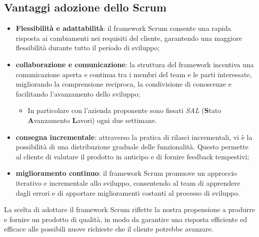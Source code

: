 \subsection{Vantaggi adozione dello Scrum}
\begin{itemize}
    \item \textbf{Flessibilità e adattabilità}: il framework Scrum consente una rapida risposta ai cambiamenti nei requisiti del cliente, garantendo una maggiore flessibilità durante tutto il periodo di sviluppo;
    \item \textbf{collaborazione e comunicazione}: la struttura del framework incentiva una comunicazione aperta e continua tra i membri del team e le parti interessate, migliorando la comprensione reciproca, la condivisione di conoscenze e facilitando l'avanzamento dello sviluppo;
    \begin{itemize}
        \item In particolare con l’azienda proponente sono fissati \textit{SAL} (\textbf{S}tato \textbf{A}vanzamento \textbf{L}avori) ogni due settimane.       
    \end{itemize}
    \item \textbf{consegna incrementale}: attraverso la pratica di rilasci incrementali, vi è la possibilità di una distribuzione graduale delle funzionalità. Questo permette al cliente di valutare il prodotto in anticipo e di fornire feedback tempestivi;
    \item \textbf{miglioramento continuo}: il framework Scrum promuove un approccio iterativo e incrementale allo sviluppo, consentendo al team di apprendere dagli errori e di apportare miglioramenti costanti al processo di sviluppo.
\end{itemize}
La scelta di adottare il framework Scrum riflette la nostra propensione a produrre e fornire un prodotto di qualità, in modo da garantire una risposta efficiente ed efficace alle possibili nuove richieste che il cliente potrebbe avanzare.

